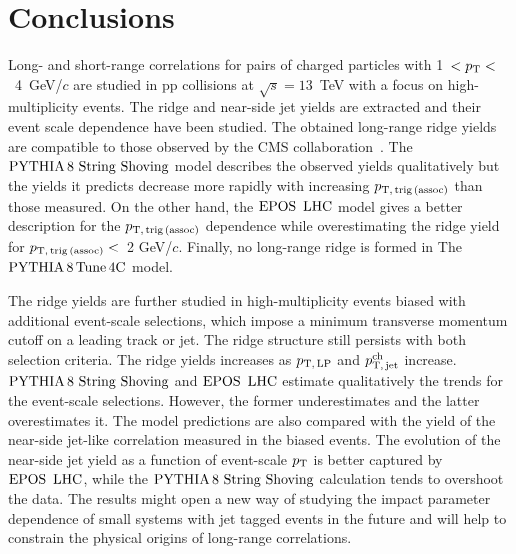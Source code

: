 
\section{Conclusions}
\label{sec:summary}

Long- and short-range correlations for pairs of charged particles with 1~$ < p_\mathrm{T} < $~4~GeV/$c$ are studied in pp collisions at $\sqrt{s} = 13$~TeV with a focus on high-multiplicity events. The ridge and near-side jet yields are extracted and their event scale dependence have been studied. The obtained long-range ridge yields are compatible to those observed by the CMS collaboration~\cite{Khachatryan:2015lva}.
The ${\mathrm{PYTHIA}\,8~\mathrm{String}~}\mathrm{Shoving}$ model describes the observed yields qualitatively but the yields it predicts decrease more rapidly with increasing $p_\mathrm{T,\,trig\,(assoc)}$ than those measured. On the other hand, the ${\mathrm{EPOS}\,~\mathrm{LHC}}$ model gives a better description for the $p_\mathrm{T,\,trig\,(assoc)}$ dependence while overestimating the ridge yield for $p_\mathrm{T,\,trig\,(assoc)}<$~2 GeV/$c$. Finally, no long-range ridge is formed in The $\mathrm{PYTHIA}\,8\,\mathrm{Tune\,4C}$ model.

The ridge yields are further studied in high-multiplicity events biased with additional event-scale selections, which impose a minimum transverse momentum cutoff on a leading track or jet. The ridge structure still persists with both selection criteria. The ridge yields increases as $p_\mathrm{T,\,LP}$ and $p_\mathrm{T,\,jet}^\mathrm{ch}$ increase. ${\mathrm{PYTHIA}\,8~\mathrm{String}~}\mathrm{Shoving}$ and ${\mathrm{EPOS}\,~\mathrm{LHC}}$ estimate qualitatively the trends for the event-scale selections. However, the former underestimates and the latter overestimates it. The model predictions are also compared with the yield of the near-side jet-like correlation measured in the biased events. The evolution of the near-side jet yield as a function of event-scale $p_\mathrm{T}$ is better captured by ${\mathrm{EPOS}\,~\mathrm{LHC}}$, while the ${\mathrm{PYTHIA}\,8~\mathrm{String}~}\mathrm{Shoving}$ calculation tends to overshoot the data. 
The results might open a new way of studying the impact parameter dependence of small systems with jet tagged events in the future and will help to constrain the physical origins of long-range correlations.
